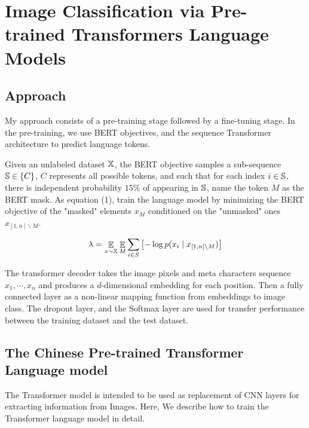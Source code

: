 \documentclass[10pt,twocolumn,letterpaper]{article}
\begin{document}

\section{Image Classification via Pre-trained Transformers Language Models}


\subsection{Approach}

My approach consists of a pre-training stage followed by a fine-tuning stage.
In the pre-training, we use BERT objectives, and the sequence Transformer architecture to predict language tokens.

\par Given an unlabeled dataset $\Bbb X$, the BERT objective samples a sub-sequence $\Bbb S \in \{C\}$,
$C$ represents all possible tokens, and such that for each index $i \in \Bbb S$,
there is independent probability $15\%$ of appearing in $\Bbb S$,
name the token $M$ as the BERT mask.
As equation (1), train the language model by minimizing the BERT objective of the "masked" elements $x_M$
conditioned on the "unmasked" ones $x_{\left[1,n\right]\backslash M}$.

\begin{equation}
  \lambda = \mathop{\Bbb E}\limits_{x\sim\Bbb X} \mathop{\Bbb E}\limits_{M} \sum_{i\in S}{\bigl[-\log{p(x_i\mid x_{\left[1,n \right]\backslash M})\bigr]}}
\end{equation}

\par The transformer decoder takes the image pixels and meta characters sequence $x_1,\cdots,x_n$ and produces a $d$-dimensional
embedding for each position.
Then a fully connected layer as a non-linear mapping function from embeddings to image class.
The dropout layer, and the Softmax layer are used for transfer performance between the training dataset and the test dataset.

\subsection{The Chinese Pre-trained Transformer Language model}

\par The Transformer model is intended to be used as replacement of CNN layers for extracting information from Images.
Here, We describe how to train the Transformer language model in detail.
\end{document}
